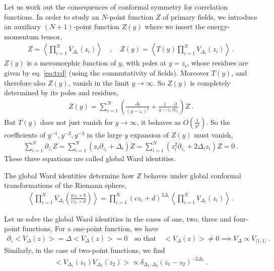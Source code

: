 \documentclass[12pt, a4paper]{article}
\theoremstyle{break}
\begin{document}
Let us work out the consequences of conformal symmetry for correlation functions.
In order to study an $N$-point function $Z$ of primary fields, we introduce an auxiliary $(N+1)$-point function $Z(y)$ where we insert the energy-momentum tensor,
\begin{align}
 Z = \left< \prod_{i=1}^N V_{\Delta_i}(z_i) \right> \quad , \quad Z(y) = \left< T(y) \prod_{i=1}^N V_{\Delta_i}(z_i) \right> \ .
\end{align}
$Z(y)$ is a meromorphic function of $y$, with poles at $y=z_i$, whose residues are given by eq. \eqref{eq:tvd} (using the commutativity of fields).
Moreover $T(y)$, and therefore also $Z(y)$, vanish in the limit $y\to \infty$. So $Z(y)$ is completely determined by its poles and residues,
\begin{align}
 Z(y) = \sum_{i=1}^N \left(\frac{\Delta_i}{(y-z_i)^2} +\frac{1}{y-z_i}\frac{\partial}{\partial z_i}\right) Z\ .
 \label{eq:zy}
\end{align}
But $T(y)$ does not just vanish for $y\to \infty$, it behaves as $O(\frac{1}{y^4})$.
So the coefficients of $y^{-1}, y^{-2}, y^{-3}$ in the large $y$ expansion of $Z(y)$ must vanish, 
\begin{align}
 \sum_{i=1}^N \partial_{z_i} Z = \sum_{i=1}^N \left(z_i \partial_{z_i} + \Delta_i\right) Z = \sum_{i=1}^N \left(z_i^2 \partial_{z_i} + 2\Delta_iz_i\right) Z = 0\ .
 \label{eq:gward}
\end{align}
These three equations are called global Ward identities. 
\begin{tcolorbox}
The global Ward identities determine how $Z$ behaves under global conformal transformations of the Riemann sphere,
\begin{align}
 \left< \prod_{i=1}^N  V_{\Delta_i}\left(\frac{az_i+b}{cz_i+d}\right) \right>
 = \prod_{i=1}^N (cz_i +d)^{2\Delta_i} \left< \prod_{i=1}^N V_{\Delta_i}(z_i) \right>\ .
 \label{eq:zgc}
\end{align}
\end{tcolorbox}
Let us solve the global Ward identities in the cases of one, two, three and four-point functions. For a one-point function, we have 
\begin{align}
\partial_z \Big< V_\Delta(z)\Big> =  \Delta \Big< V_\Delta(z)\Big> = 0\quad \text{so that} \quad \Big< V_\Delta(z)\Big> \neq 0 \implies V_\Delta \propto V_{\langle 1,1\rangle}\ .
\end{align}
Similarly, in the case of two-point functions, we find 
\begin{align}
 \Big< V_{\Delta_1}(z_1)V_{\Delta_2}(z_2) \Big> \propto \delta_{\Delta_1,\Delta_2} (z_1-z_2)^{-2\Delta_1} \ .
 \label{eq:2pt}
\end{align}
\end{document}
